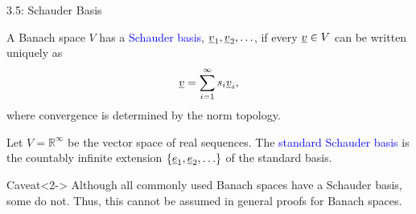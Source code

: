 \documentclass[10pt,english,aspectratio=169]{beamer}
\begin{document}
\begin{frame}{3.5: Schauder Basis}

\begin{definition}
A Banach space $V$ has a \textcolor{blue}{Schauder basis}, $\underline{v}_1, \underline{v}_2, \ldots$, if every $\underline{v} \in V$ can be written uniquely as
\[ \underline{v} = \sum_{i=1}^\infty s_i \underline{v}_i, \]
where convergence is determined by the norm topology.
\end{definition}

\begin{example}
Let $V = \mathbb{R}^\infty$ be the vector space of real sequences.
The \textcolor{blue}{standard Schauder basis} is the countably infinite extension $\{\underline{e}_1 ,\underline{e}_2, \ldots \}$ of the standard basis.
\end{example}

\begin{block}{Caveat}<2->
Although all commonly used Banach spaces have a Schauder basis, some do not.
Thus, this cannot be assumed in general proofs for Banach spaces.
\end{block}

\end{frame}
\end{document}
